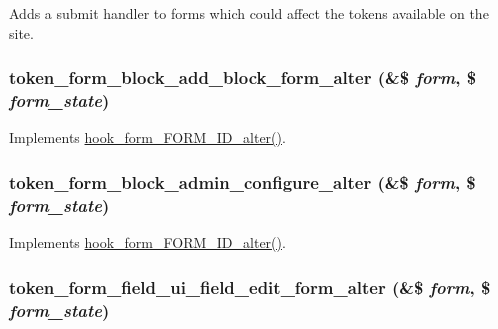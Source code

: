 Adds a submit handler to forms which could affect the tokens available on the site. \hypertarget{token_8module_a7a29ce869431da05b8fc1f92bde7f655}{
\subsubsection[{token\_\-form\_\-block\_\-add\_\-block\_\-form\_\-alter}]{\setlength{\rightskip}{0pt plus 5cm}token\_\-form\_\-block\_\-add\_\-block\_\-form\_\-alter (\&\$ {\em form}, \/  \$ {\em form\_\-state})}}
\label{token_8module_a7a29ce869431da05b8fc1f92bde7f655}
Implements \hyperlink{group__hooks_ga8d4a4089551493d55911bd5c4f218264}{hook\_\-form\_\-FORM\_\-ID\_\-alter()}. \hypertarget{token_8module_aae92360a59b14abf3de3aad884459bbc}{
\subsubsection[{token\_\-form\_\-block\_\-admin\_\-configure\_\-alter}]{\setlength{\rightskip}{0pt plus 5cm}token\_\-form\_\-block\_\-admin\_\-configure\_\-alter (\&\$ {\em form}, \/  \$ {\em form\_\-state})}}
\label{token_8module_aae92360a59b14abf3de3aad884459bbc}
Implements \hyperlink{group__hooks_ga8d4a4089551493d55911bd5c4f218264}{hook\_\-form\_\-FORM\_\-ID\_\-alter()}. \hypertarget{token_8module_aafd876aa871c14cf1c4ed7cc130a7fef}{
\subsubsection[{token\_\-form\_\-field\_\-ui\_\-field\_\-edit\_\-form\_\-alter}]{\setlength{\rightskip}{0pt plus 5cm}token\_\-form\_\-field\_\-ui\_\-field\_\-edit\_\-form\_\-alter (\&\$ {\em form}, \/  \$ {\em form\_\-state})}}
